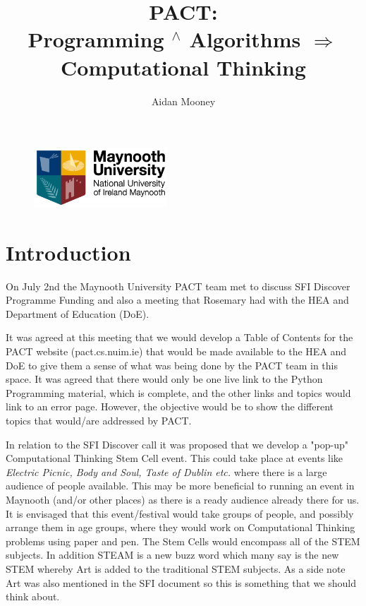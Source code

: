 \documentclass{article}
\begin{document}
\title{\large{\textbf{PACT: \\ Programming $^{\wedge}$ Algorithms $\Longrightarrow$ Computational Thinking}}}

\author{Aidan Mooney}

\begin{figure}
    \centering
    \includegraphics[width = 5cm]{logo}
    \label{logo}
\end{figure}
\maketitle

\section{Introduction}

On July 2nd the Maynooth University PACT team met to discuss SFI Discover Programme Funding and also a meeting that Rosemary had with the HEA and Department of Education (DoE).

It was agreed at this meeting that we would develop a Table of Contents for the PACT website (pact.cs.nuim.ie) that would be made available to the HEA and DoE to give them a sense of what was being done by the PACT team in this space. It was agreed that there would only be one live link to the Python Programming material, which is complete, and the other links and topics would link to an error page. However, the objective would be to show the different topics that would/are addressed by PACT.

In relation to the SFI Discover call it was proposed that we develop a "pop-up" Computational Thinking Stem Cell event. This could take place at events like \textit{Electric Picnic, Body and Soul, Taste of Dublin etc.} where there is a large audience of people available. This may be more beneficial to running an event in Maynooth (and/or other places) as there is a ready audience already there for us. It is envisaged that this event/festival would take groups of people, and possibly arrange them in age groups, where they would work on Computational Thinking problems using paper and pen. The Stem Cells would encompass all of the STEM subjects. In addition STEAM is a new buzz word which many say is the new STEM whereby Art is added to the traditional STEM subjects. As a side note Art was also mentioned in the SFI document so this is something that we should think about.
\end{document}
